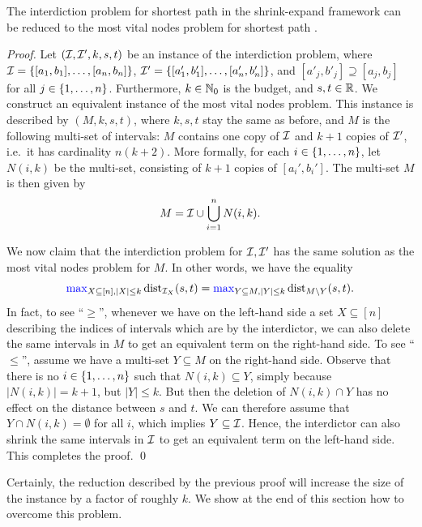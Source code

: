 \begin{lemma}
\label{lemma:shortest_path_reduction}
The interdiction problem for shortest path in the shrink-expand framework can be reduced to the most vital nodes problem for shortest path .
\end{lemma}
\begin{proof} 
Let $(\mathcal{I}, \mathcal{I}', k, s,t)$ be an instance of the interdiction problem, where $\mathcal{I} = \{ [a_1, b_1], \ldots, [a_n, b_n] \}$, $\mathcal{I}' = \{ [a'_1, b'_1], \ldots, [a'_n, b'_n] \}$, and $[a'_j, b'_j] \supseteq [a_j, b_j]$ for all $j \in \{ 1, \ldots, n \}$. Furthermore, $k \in \mathbb{N}_0$ is the budget, and $s, t \in \mathbb{R}$. We construct an equivalent instance of the most vital nodes problem. This instance is described by $(M, k, s, t)$, where $k, s, t$ stay the same as before, and $M$ is the following multi-set of intervals: $M$ contains one copy of $\mathcal{I}$ and $k+1$ copies of $\mathcal{I}'$, i.e.\ it has cardinality $n(k+2)$. More formally, for each $i \in \{ 1, \ldots, n \}$, let $N(i, k)$ be the multi-set, consisting of $k+1$ copies of $[a_i', b_i']$. The multi-set $M$ is then given by
\[M = \mathcal{I} \cup \bigcup_{i=1}^n N(i, k). \]

We now claim that the interdiction problem for $\mathcal{I}, \mathcal{I}'$ has the same solution as the most vital nodes problem for $M$. In other words, we have the equality
\[\textcolor{blue}{\max}_{X \subseteq [n], |X| \leq k} \operatorname{\text{dist}}_{\mathcal{I}_X}(s, t) = \textcolor{blue}{\max}_{Y \subseteq M, |Y| \leq k} \operatorname{\text{dist}}_{M \setminus Y}(s, t). \]
In fact, to see \enquote{$\geq$}, whenever we have on the left-hand side a set $X \subseteq [n]$ describing the indices of intervals which are  by the interdictor, 
we can also delete the same intervals in $M$ to get an equivalent term on the right-hand side. 
To see \enquote{$\leq$}, assume we have a multi-set $Y \subseteq M$ on the right-hand side. 
Observe that there is no $i \in \{ 1, \ldots, n \}$ such that $N(i, k) \subseteq Y$, simply because $|N(i, k)| = k+1$, 
but $|Y| \leq k$. But %
then the deletion of $N(i, k) \cap Y$ has no effect on the distance between $s$ and $t$. 
We can therefore assume that $Y \cap N(i,k) = \emptyset$ for all $i$, which implies $Y \subseteq \mathcal{I}$. 
Hence, the interdictor can also shrink the same intervals in $\mathcal{I}$ to get an equivalent term on the left-hand side. This completes the proof.
\qed\end{proof}

Certainly, the reduction described by the previous proof will increase the size of the instance by a factor of roughly $k$. We show at the end of this section how to overcome this problem.

